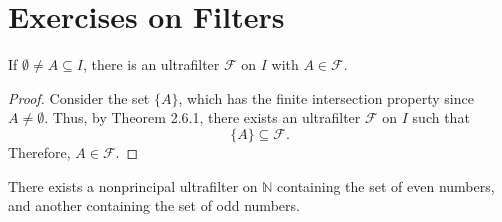 \section{Exercises on Filters}

\begin{tcolorbox}[title=Problem 1, breakable]
    If $\emptyset \ne A \subseteq I$, there is an ultrafilter $\mathcal{F}$
    on $I$ with $A \in \mathcal{F}$.
\end{tcolorbox}

\begin{proof}
    Consider the set $\{A\}$, which has the finite intersection property since $A \ne \emptyset$.
    Thus, by Theorem 2.6.1, there exists an ultrafilter $\mathcal{F}$ on $I$ such that
    \[
        \{A\} \subseteq \mathcal{F}.
    \]
    Therefore, $A \in \mathcal{F}$.
\end{proof}


\begin{tcolorbox}[title=Problem 2, breakable]
    There exists a nonprincipal ultrafilter on $\mathbb{N}$
    containing the set of even numbers, and another containing the 
    set of odd numbers.
\end{tcolorbox}

